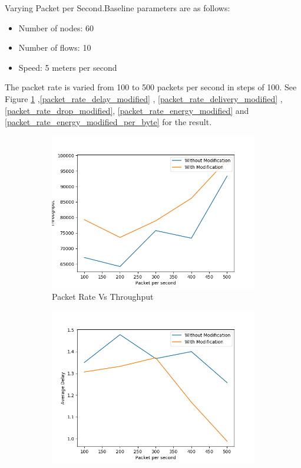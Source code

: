 Varying Packet per Second.Baseline parameters are as follows:
\begin{itemize}
    \item Number of nodes: 60
    \item Number of flows: 10
    \item Speed: 5 meters per second
\end{itemize}
The packet rate is varied from 100 to 500 packets per second in steps of 100.
See Figure \ref{packet_rate_throughput_modified} ,\ref{packet_rate_delay_modified} , \ref{packet_rate_delivery_modified} , \ref{packet_rate_drop_modified}, \ref{packet_rate_energy_modified} and \ref{packet_rate_energy_modified_per_byte}  for the result.
\begin{figure}[h]
\begin{subfigure}{.5\textwidth}
  \centering
  \includegraphics[width=.8\linewidth]{modified_fig/PacketpersecondvsThroughput.png}
     \caption{Packet Rate Vs Throughput}
    \label{packet_rate_throughput_modified}
\end{subfigure}
\begin{subfigure}{.5\textwidth}
  \centering
  \includegraphics[width=.8\linewidth]{modified_fig/PacketpersecondvsAverageDelay.png}

\end{subfigure}
\end{figure}
